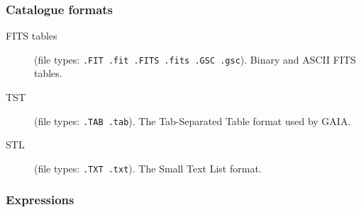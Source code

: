 \documentclass[twoside,11pt]{starlink}
\begin{document}
\subsubsection*{Catalogue formats}

\begin{description}

  \item[FITS tables] (file types: \texttt{.FIT .fit .FITS .fits .GSC .gsc}).
   Binary and ASCII FITS tables.

  \item[TST] (file types: \texttt{.TAB .tab}).
   The Tab-Separated Table format used by GAIA.

  \item[STL] (file types: \texttt{.TXT .txt}).
   The Small Text List format.




\end{description}

\subsubsection*{Expressions}
\end{document}
